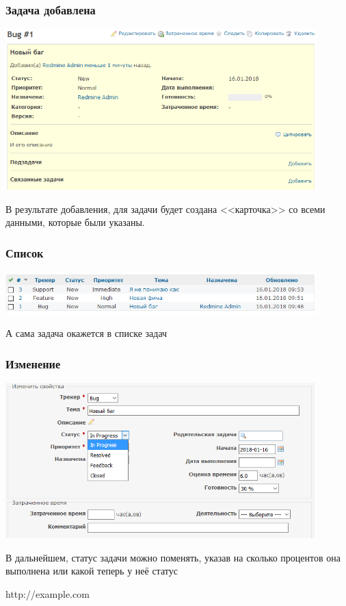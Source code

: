 \documentclass{../industrial-development}
\begin{document}
\begin{frame} \frametitle{Задача добавлена}
\centerline{\includegraphics[width=0.9\textwidth]{status.png}}
\end{frame}
\lecturenotes
В результате добавления, для задачи будет создана <<карточка>> со всеми данными, которые были указаны.

\begin{frame} \frametitle{Список}
\centerline{\includegraphics[width=0.9\textwidth]{list.png}}
\end{frame}
\lecturenotes
А сама задача окажется в списке задач

\begin{frame} \frametitle{Изменение}
\centerline{\includegraphics[width=0.9\textwidth]{changing.png}}
\end{frame}
\lecturenotes
В дальнейшем, статус задачи можно поменять, указав на сколько процентов она выполнена или какой теперь у неё статус

\begin{thebibliography}{99}
http://example.com
\end{thebibliography}
\end{document}
